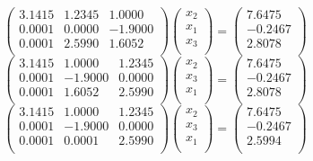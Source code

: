 \documentclass[11pt,a4paper,oneside]{article}
\begin{document}
$$ \left(\begin{matrix}         3.1415 & 1.2345 & 1.0000 \\     0.0001 & 0.0000 & -1.9000 \\    0.0001 & 2.5990 & 1.6052 \\ \end{matrix}\right) \left(\begin{matrix}    x_2 \\  x_1 \\  x_3 \\ \end{matrix}\right) = \left(\begin{matrix}    7.6475 \\       -0.2467 \\      2.8078 \\ \end{matrix}\right) $$
$$ \left(\begin{matrix}         3.1415 & 1.0000 & 1.2345 \\     0.0001 & -1.9000 & 0.0000 \\    0.0001 & 1.6052 & 2.5990 \\ \end{matrix}\right) \left(\begin{matrix}    x_2 \\  x_3 \\  x_1 \\ \end{matrix}\right) = \left(\begin{matrix}    7.6475 \\       -0.2467 \\      2.8078 \\ \end{matrix}\right) $$
$$ \left(\begin{matrix}         3.1415 & 1.0000 & 1.2345 \\     0.0001 & -1.9000 & 0.0000 \\    0.0001 & 0.0001 & 2.5990 \\ \end{matrix}\right) \left(\begin{matrix}    x_2 \\  x_3 \\  x_1 \\ \end{matrix}\right) = \left(\begin{matrix}    7.6475 \\       -0.2467 \\      2.5994 \\ \end{matrix}\right) $$
\end{document}
